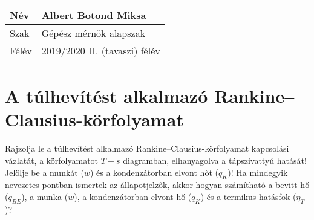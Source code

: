 \begin{tabular}{ | p{2cm} | p{14cm} | } 
	\hline
	Név & Albert Botond Miksa \\ 
	\hline
	Szak & Gépész mérnök alapszak  \\ 
	\hline
	Félév & 2019/2020 II. (tavaszi) félév \\ 
	\hline
\end{tabular}

\section*{A túlhevítést alkalmazó Rankine--Clausius-körfolyamat}

Rajzolja le a túlhevítést alkalmazó Rankine–Clausius-körfolyamat kapcsolási vázlatát, a körfolyamatot $T-s$ diagramban, elhanyagolva a tápszivattyú hatását! Jelölje be a munkát ($w$) és a kondenzátorban elvont hőt ($q_K$)! Ha mindegyik nevezetes pontban ismertek az állapotjelzők, akkor hogyan számítható a bevitt hő ($q_{BE}$), a munka ($w$), a kondenzátorban elvont hő ($q_K$) és a termikus hatásfok ($\eta_T$)?
